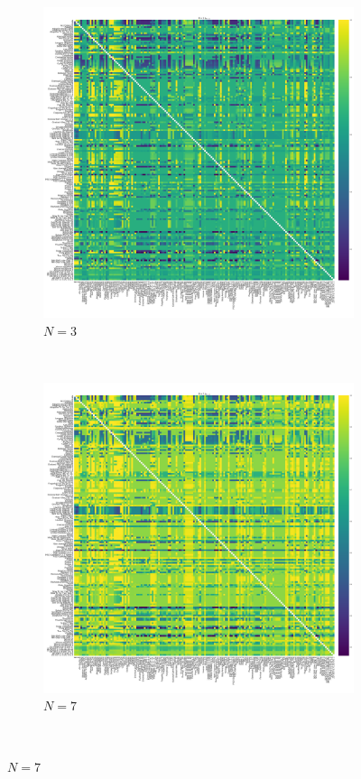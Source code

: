 \documentclass{article}
\begin{document}
\begin{figure}[!hbtp]
    \centering
    \begin{subfigure}[t]{.3\textwidth}
        \centering
        \includegraphics[width=.8\textwidth]{./img/fixation_heatmap_3_resist.pdf}
        \caption{\(N=3\)}
    \end{subfigure}%
    ~
    \begin{subfigure}[t]{.3\textwidth}
        \centering
        \includegraphics[width=.8\textwidth]{./img/fixation_heatmap_7_resist.pdf}
        \caption{\(N=7\)}
    \end{subfigure}%
    ~

\end{figure}
\end{document}
